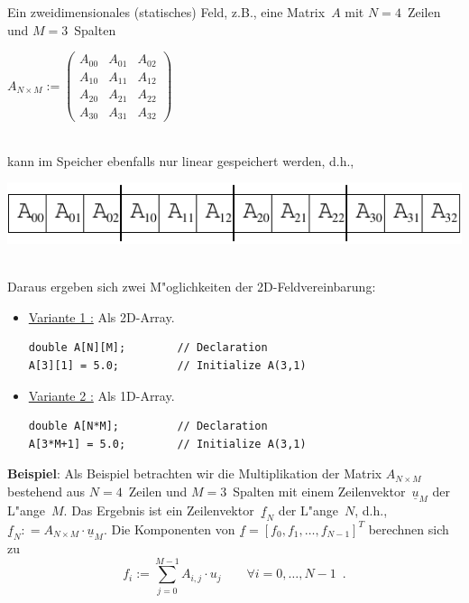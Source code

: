 Ein zweidimensionales (statisches) Feld, z.B., eine Matrix~$A$ mit $N=4$~Zeilen
und $M=3$~Spalten
\\[0.5ex]
\centerline{
$
A_{N \times M} :=
\begin{pmatrix}
 A_{00} & A_{01} & A_{02} \\
 A_{10} & A_{11} & A_{12} \\
 A_{20} & A_{21} & A_{22} \\
 A_{30} & A_{31} & A_{32}
\end{pmatrix}
$
}
\\[0.5ex]
kann im Speicher ebenfalls nur linear gespeichert werden, d.h.,
\\
\centerline{\includegraphics[scale=0.9]{kap512b.pdf}}
\\[0.5ex]
Daraus ergeben sich zwei M"oglichkeiten der 2D-Feldvereinbarung:
\begin{itemize}
 \item \underline{Variante 1 :} Als 2D-Array.
%
\\[0.5ex]
\begin{minipage} {0.8\textwidth}
\begin{verbatim}
double A[N][M];        // Declaration
A[3][1] = 5.0;         // Initialize A(3,1)
\end{verbatim}
\end{minipage}
%
 \item \underline{Variante 2 :} Als 1D-Array.
 \label{page:2DarrayVariant2}
%
\\[0.5ex]
\begin{minipage} {0.8\textwidth}
\begin{verbatim}
double A[N*M];         // Declaration
A[3*M+1] = 5.0;        // Initialize A(3,1)
\end{verbatim}
\end{minipage}
%
\end{itemize}
%
\textbf{Beispiel}:  Als Beispiel betrachten wir die Multiplikation
der Matrix $A_{N \times M}$
bestehend aus $N=4$~Zeilen und $M=3$~Spalten
mit einem Zeilenvektor~$\underline{u}_M$
der L"ange~$M$.
Das Ergebnis ist ein Zeilenvektor~$\underline{f}_N$ der L"ange~$N$,
d.h., $\underline{f}_N : = A_{N \times M} \cdot \underline{u}_M$\enspace.
%
Die Komponenten von $\underline{f} = [f_0,f_1,\ldots,f_{N-1}]^T$
berechnen sich zu
\begin{displaymath}
 f_i := \sum_{j=0}^{M-1} A_{i,j} \cdot u_j
 \qquad \forall i=0,\ldots,N-1 \enspace.
\end{displaymath}

